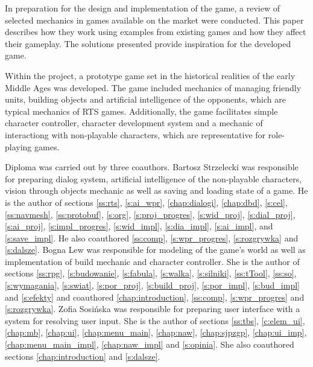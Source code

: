In preparation for the design and implementation of the game, a review of selected mechanics in games available
on the market were conducted. This paper describes how they work using examples from existing games and how
they affect their gameplay. The solutions presented provide inspiration for the developed game.

Within the project, a prototype game set in the historical realities of the early Middle Ages was developed. The game
included mechanics of managing friendly units, building objects and artificial intelligence of the opponents, which are
typical mechanics of RTS games. Additionally, the game facilitates simple character controller, character development
system and a mechanic of interactiong with non-playable characters, which are representative for role-playing games.

Diploma was carried out by three coauthors. Bartosz Strzelecki was responsible for preparing dialog system, artificial
intelligence of the non-playable characters, vision through objects mechanic as well as saving and loading state of a game.
He is the author of sections \ref{ss:rts},
\ref{s:ai_wpr}, \ref{chap:dialogi}, \ref{chap:dbd}, \ref{s:cel}, \ref{ss:navmesh}, \ref{ss:protobuf}, \ref{s:org}, \ref{s:proj_progres}, \ref{s:wid_proj},
\ref{s:dial_proj}, \ref{s:ai_proj}, \ref{s:impl_progres}, \ref{s:wid_impl}, \ref{s:dia_impl}, \ref{s:ai_impl}, and
\ref{s:save_impl}. He also coauthored \ref{ss:comp}, \ref{s:wpr_progres}, \ref{s:rozgrywka} and \ref{s:dalsze}. Bogna Lew
was responsible for modeling of the game's world as well as implementation of build mechanic and character controller. She
is the author of sections \ref{ss:rpg}, \ref{s:budowanie}, \ref{s:fabula}, \ref{s:walka}, \ref{s:silniki},
\ref{ss:tTool}, \ref{ss:so}, \ref{s:wymagania}, \ref{s:swiat}, \ref{s:por_proj}, \ref{s:build_proj}, \ref{s:por_impl}, \ref{s:bud_impl} and
\ref{s:efekty} and coauthored \ref{chap:introduction}, \ref{ss:comp}, \ref{s:wpr_progres} and \ref{s:rozgrywka}.
Zofia Sosińska was responsible for preparing user interface with a system for resolving user input. She is the author of
sections \ref{ss:tbs}, \ref{c:elem_ui}, \ref{chap:mb}, \ref{chap:ui},
\ref{chap:menu_main}, \ref{chap:naw}, \ref{chap:sjpzgp}, \ref{chap:ui_imp}, \ref{chap:menu_main_impl},
\ref{chap:naw_impl} and  \ref{s:opinia}. She also coauthored sections \ref{chap:introduction} and \ref{s:dalsze}.
